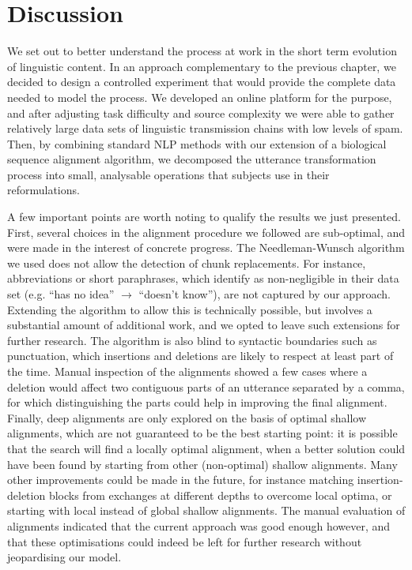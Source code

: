 \section{Discussion}\label{sec:gistr-discussion}

We set out to better understand the process at work in the short term
evolution of linguistic content. In an approach complementary to the
previous chapter, we decided to design a controlled experiment that
would provide the complete data needed to model the process. We
developed an online platform for the purpose, and after adjusting task
difficulty and source complexity we were able to gather relatively large
data sets of linguistic transmission chains with low levels of spam.
Then, by combining standard NLP methods with our extension of a
biological sequence alignment algorithm, we decomposed the utterance
transformation process into small, analysable operations that subjects
use in their reformulations.

A few important points are worth noting to qualify the results we just
presented. First, several choices in the alignment procedure we followed
are sub-optimal, and were made in the interest of concrete progress. The
Needleman-Wunsch algorithm we used does not allow the detection of chunk
replacements. For instance, abbreviations or short paraphrases, which
\textcite{lauf_analyzing_2013} identify as non-negligible in their data
set (e.g. \enquote{has no idea} \(\rightarrow\) \enquote{doesn't know}),
are not captured by our approach. Extending the algorithm to allow this
is technically possible, but involves a substantial amount of additional
work, and we opted to leave such extensions for further research. The
algorithm is also blind to syntactic boundaries such as punctuation,
which insertions and deletions are likely to respect at least part of
the time. Manual inspection of the alignments showed a few cases where a
deletion would affect two contiguous parts of an utterance separated by
a comma, for which distinguishing the parts could help in improving the
final alignment. Finally, deep alignments are only explored on the basis
of optimal shallow alignments, which are not guaranteed to be the best
starting point: it is possible that the search will find a locally
optimal alignment, when a better solution could have been found by
starting from other (non-optimal) shallow alignments. Many other
improvements could be made in the future, for instance matching
insertion-deletion blocks from exchanges at different depths to overcome
local optima, or starting with local instead of global shallow
alignments. The manual evaluation of alignments indicated that the
current approach was good enough however, and that these optimisations
could indeed be left for further research without jeopardising our
model.

